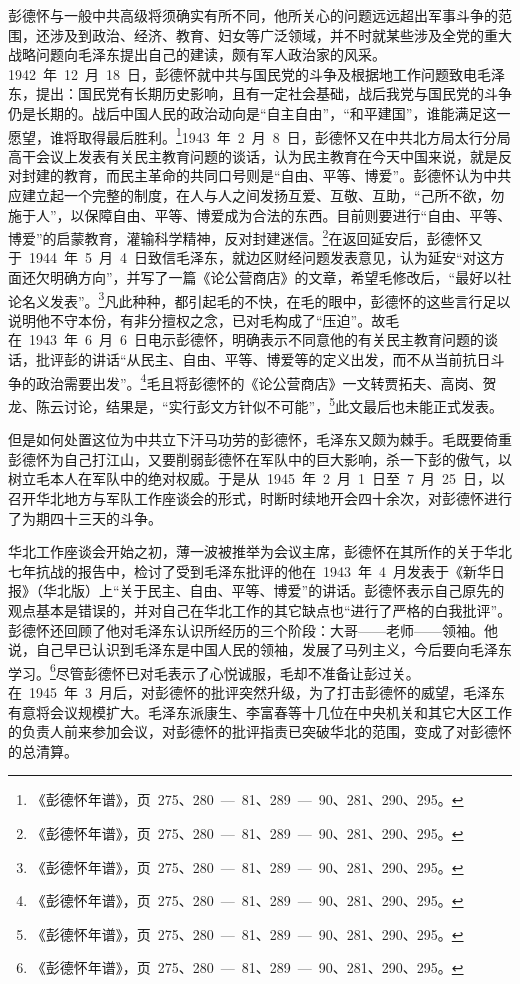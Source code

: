 彭德怀与一般中共高级将须确实有所不同，他所关心的问题远远超出军事斗争的范围，还涉及到政治、经济、教育、妇女等广泛领域，并不时就某些涉及全党的重大战略问题向毛泽东提出自己的建读，颇有军人政治家的风采。1942~年~12~月~18~日，彭德怀就中共与国民党的斗争及根据地工作问题致电毛泽东，提出：国民党有长期历史影响，且有一定社会基础，战后我党与国民党的斗争仍是长期的。战后中国人民的政治动向是“自主自由”，“和平建国”，谁能满足这一愿望，谁将取得最后胜利。\footnote{《彭德怀年谱》，页~275、280~—~81、289~—~90、281、290、295。}1943~年~2~月~8~日，彭德怀又在中共北方局太行分局高干会议上发表有关民主教育问题的谈话，认为民主教育在今天中国来说，就是反对封建的教育，而民主革命的共同口号则是“自由、平等、博爱”。彭德怀认为中共应建立起一个完整的制度，在人与人之间发扬互爱、互敬、互助，“己所不欲，勿施于人”，以保障自由、平等、博爱成为合法的东西。目前则要进行“自由、平等、博爱”的启蒙教育，灌输科学精神，反对封建迷信。\footnote{《彭德怀年谱》，页~275、280~—~81、289~—~90、281、290、295。}在返回延安后，彭德怀又于~1944~年~5~月~4~日致信毛泽东，就边区财经问题发表意见，认为延安“对这方面还欠明确方向”，并写了一篇《论公营商店》的文章，希望毛修改后，“最好以社论名义发表”。\footnote{《彭德怀年谱》，页~275、280~—~81、289~—~90、281、290、295。}凡此种种，都引起毛的不快，在毛的眼中，彭德怀的这些言行足以说明他不守本份，有非分擅权之念，已对毛构成了“压迫”。故毛在~1943~年~6~月~6~日电示彭德怀，明确表示不同意他的有关民主教育问题的谈话，批评彭的讲话“从民主、自由、平等、博爱等的定义出发，而不从当前抗日斗争的政治需要出发”。\footnote{《彭德怀年谱》，页~275、280~—~81、289~—~90、281、290、295。}毛且将彭德怀的《论公营商店》一文转贾拓夫、高岗、贺龙、陈云讨论，结果是，“实行彭文方针似不可能”，\footnote{《彭德怀年谱》，页~275、280~—~81、289~—~90、281、290、295。}此文最后也未能正式发表。

但是如何处置这位为中共立下汗马功劳的彭德怀，毛泽东又颇为棘手。毛既要倚重彭德怀为自己打江山，又要削弱彭德怀在军队中的巨大影响，杀一下彭的傲气，以树立毛本人在军队中的绝对权威。于是从~1945~年~2~月~1~日至~7~月~25~日，以召开华北地方与军队工作座谈会的形式，时断时续地开会四十余次，对彭德怀进行了为期四十三天的斗争。

华北工作座谈会开始之初，薄一波被推举为会议主席，彭德怀在其所作的关于华北七年抗战的报告中，检讨了受到毛泽东批评的他在~1943~年~4~月发表于《新华日报》（华北版）上“关于民主、自由、平等、博爱”的讲话。彭德怀表示自己原先的观点基本是错误的，并对自己在华北工作的其它缺点也“进行了严格的白我批评”。彭德怀还回顾了他对毛泽东认识所经历的三个阶段：大哥——老师——领袖。他说，自己早已认识到毛泽东是中国人民的领袖，发展了马列主义，今后要向毛泽东学习。\footnote{《彭德怀年谱》，页~275、280~—~81、289~—~90、281、290、295。}尽管彭德怀已对毛表示了心悦诚服，毛却不准备让彭过关。在~1945~年~3~月后，对彭德怀的批评突然升级，为了打击彭德怀的威望，毛泽东有意将会议规模扩大。毛泽东派康生、李富春等十几位在中央机关和其它大区工作的负责人前来参加会议，对彭德怀的批评指责已突破华北的范围，变成了对彭德怀的总清算。

